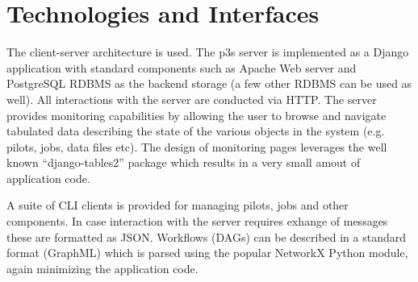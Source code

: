 \documentclass{webofc}
\begin{document}
\section{Technologies and Interfaces}

The client-server architecture is used. The p3s server is implemented as a Django \cite{django} application
with standard components such as Apache Web server and PostgreSQL RDBMS as the backend storage
(a few other RDBMS can be used as well). All interactions with the server
are conducted via HTTP. The server provides monitoring capabilities by allowing the user to browse and navigate
tabulated data describing the state of the various objects in the system (e.g. pilots, jobs, data files etc).
The design of monitoring pages leverages the well known ``django-tables2'' package which results
in a very small amout of application code.

A suite of CLI clients is provided for managing pilots, jobs and
other components. In case interaction with the server requires exhange of messages these are
formatted as JSON. Workflows (DAGs) can be described in a standard format (GraphML) which is parsed
using the popular NetworkX Python module, again minimizing the application code.
\end{document}
